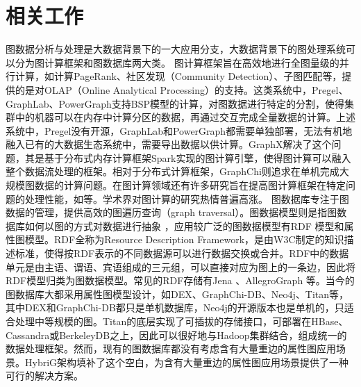
\chapter{相关工作}
图数据分析与处理是大数据背景下的一大应用分支\supercite{big_data}，大数据背景下的图处理系统可以分为图计算框架和图数据库两大类。
图计算框架旨在高效地进行全图量级的并行计算，如计算PageRank\supercite{pagerank}、社区发现\supercite{community_detection}（Community Detection）、子图匹配\supercite{subgraph_listing}等，提供的是对OLAP（Online Analytical Processing）的支持。这类系统中，Pregel\supercite{pregel}、GraphLab\supercite{graphlab}、PowerGraph\supercite{powergraph}支持BSP\supercite{BSP}模型的计算，对图数据进行特定的分割，使得集群中的机器可以在内存中计算分区的数据，再通过交互完成全量数据的计算。上述系统中，Pregel没有开源，GraphLab和PowerGraph都需要单独部署，无法有机地融入已有的大数据生态系统中，需要导出数据以供计算。GraphX\supercite{graphx}解决了这个问题，其是基于分布式内存计算框架Spark\supercite{spark}实现的图计算引擎，使得图计算可以融入整个数据流处理的框架。相对于分布式计算框架，GraphChi\supercite{graphchi}则追求在单机完成大规模图数据的计算问题。在图计算领域还有许多研究旨在提高图计算框架在特定问题的处理性能，如\supercites{xuning_LogGP,xuning_2,shaoxia_1,shaoxia_2,shaoxia_3}等。学术界对图计算的研究热情普遍高涨。
图数据库专注于图数据的管理，提供高效的图遍历查询（graph traversal）。图数据模型则是指图数据库如何以图的方式对数据进行抽象 \supercite{graph_models_survey}，应用较广泛的图数据模型有RDF 模型和属性图模型。RDF全称为Resource Description Framework，是由W3C制定的知识描述标准，使得按RDF表示的不同数据源可以进行数据交换或合并。RDF中的数据单元是由主语、谓语、宾语组成的三元组，可以直接对应为图上的一条边，因此将RDF模型归类为图数据模型。常见的RDF存储有Jena 、AllegroGraph 等。当今的图数据库大都采用属性图模型设计\supercite{graph_database_models}，如DEX\supercite{DEX}、GraphChi-DB\supercite{graphchi-db}、Neo4j、Titan等，其中DEX和GraphChi-DB都只是单机数据库，Neo4j的开源版本也是单机的，只适合处理中等规模的图。Titan的底层实现了可插拔的存储接口，可部署在HBase、Cassandra或BerkeleyDB之上，因此可以很好地与Hadoop集群结合，组成统一的数据处理框架。然而，现有的图数据库都没有考虑含有大量重边的属性图应用场景。HybriG架构填补了这个空白，为含有大量重边的属性图应用场景提供了一种可行的解决方案。


